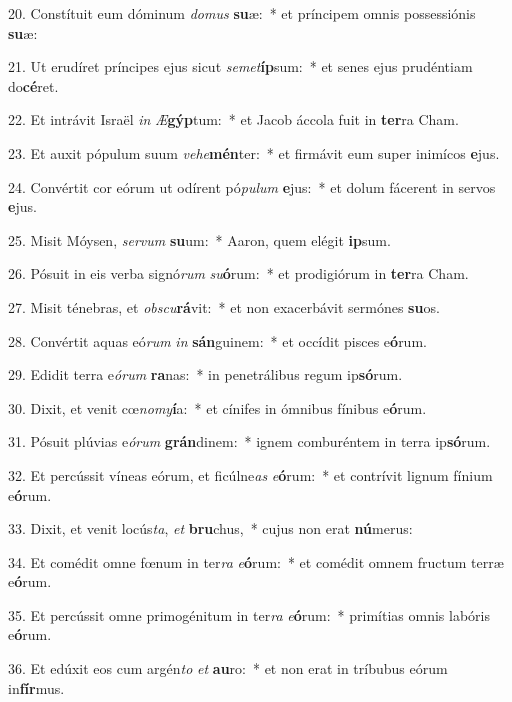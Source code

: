 20. Constítuit eum dóminum \textit{do}\textit{mus} \textbf{su}æ:~*  et príncipem omnis possessiónis \textbf{su}æ:\

21. Ut erudíret príncipes ejus sicut \textit{se}\textit{met}\textbf{íp}sum:~*  et senes ejus prudéntiam do\textbf{cé}ret.\

22. Et intrávit Israël \textit{in} \textit{Æ}\textbf{gýp}tum:~*  et Jacob áccola fuit in \textbf{ter}ra Cham.\

23. Et auxit pópulum suum \textit{ve}\textit{he}\textbf{mén}ter:~*  et firmávit eum super inimícos \textbf{e}jus.\

24. Convértit cor eórum ut odírent pó\textit{pu}\textit{lum} \textbf{e}jus:~*  et dolum fácerent in servos \textbf{e}jus.\

25. Misit Móysen, \textit{ser}\textit{vum} \textbf{su}um:~*  Aaron, quem elégit \textbf{ip}sum.\

26. Pósuit in eis verba signó\textit{rum} \textit{su}\textbf{ó}rum:~*  et prodigiórum in \textbf{ter}ra Cham.\

27. Misit ténebras, et \textit{obs}\textit{cu}\textbf{rá}vit:~*  et non exacerbávit sermónes \textbf{su}os.\

28. Convértit aquas eó\textit{rum} \textit{in} \textbf{sán}guinem:~*  et occídit pisces e\textbf{ó}rum.\

29. Edidit terra e\textit{ó}\textit{rum} \textbf{ra}nas:~*  in penetrálibus regum ip\textbf{só}rum.\

30. Dixit, et venit cœ\textit{no}\textit{my}\textbf{í}a:~*  et cínifes in ómnibus fínibus e\textbf{ó}rum.\

31. Pósuit plúvias e\textit{ó}\textit{rum} \textbf{grán}dinem:~*  ignem comburéntem in terra ip\textbf{só}rum.\

32. Et percússit víneas eórum, et ficúlne\textit{as} \textit{e}\textbf{ó}rum:~*  et contrívit lignum fínium e\textbf{ó}rum.\

33. Dixit, et venit locús\textit{ta}, \textit{et} \textbf{bru}chus,~*  cujus non erat \textbf{nú}merus:\

34. Et comédit omne fœnum in ter\textit{ra} \textit{e}\textbf{ó}rum:~*  et comédit omnem fructum terræ e\textbf{ó}rum.\

35. Et percússit omne primogénitum in ter\textit{ra} \textit{e}\textbf{ó}rum:~*  primítias omnis labóris e\textbf{ó}rum.\

36. Et edúxit eos cum argén\textit{to} \textit{et} \textbf{au}ro:~*  et non erat in tríbubus eórum in\textbf{fír}mus.\

